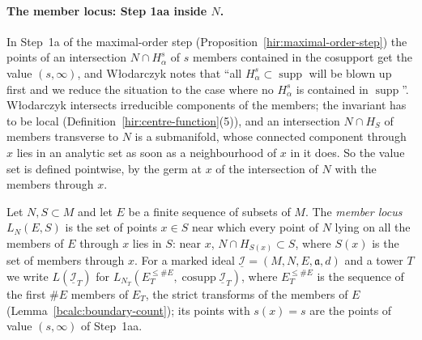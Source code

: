 \paragraph{The member locus: Step 1aa inside \(N\).} In Step~1a of the maximal-order step (Proposition~\ref{hir:maximal-order-step}) the points of an intersection
\(N\cap H^s_\alpha\) of \(s\) members contained in the cosupport get the value \((s,\infty)\), and Włodarczyk notes that ``all \(H^s_\alpha\subset\operatorname{supp}\)
will be blown up first and we reduce the situation to the case where no \(H^s_\alpha\) is contained in \(\operatorname{supp}\)''. Włodarczyk intersects irreducible
components of the members; the invariant has to be local (Definition~\ref{hir:centre-function}(5)), and an intersection \(N\cap H_S\) of members transverse
to \(N\) is a submanifold, whose connected component through \(x\) lies in an analytic set as soon as a neighbourhood of \(x\) in it does. So the value set
is defined pointwise, by the germ at \(x\) of the intersection of \(N\) with the members through \(x\).

\begin{definition}
\label{bcalc:member-locus-def}
\leanok
Let \(N,S\subset M\) and let \(E\) be a finite sequence of subsets of \(M\). The \emph{member locus} \(L_N(E,S)\) is the set of points \(x\in S\) near which every
point of \(N\) lying on all the members of \(E\) through \(x\) lies in \(S\): near \(x\), \(N\cap H_{S(x)}\subset S\), where \(S(x)\) is the set of members through
\(x\). For a marked ideal \(\underline{\mathcal I}=(M,N,E,\mathfrak a,d)\) and a tower \(T\) we write \(L(\underline{\mathcal I}_T)\) for \(L_{N_T}(E_T^{\le\#E},\operatorname{cosupp}\underline{\mathcal I}_T)\),
where \(E_T^{\le\#E}\) is the sequence of the first \(\#E\) members of \(E_T\), the strict transforms of the members of \(E\) (Lemma~\ref{bcalc:boundary-count}); its
points with \(s(x)=s\) are the points of value \((s,\infty)\) of Step~1aa.
\end{definition}

